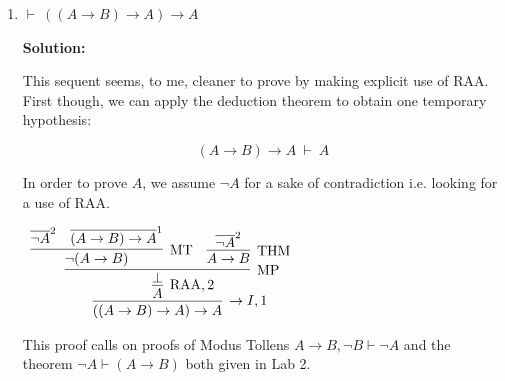 \documentclass[11pt]{report}
\newcommand{\temp}[2]{{\overline{#2}}^{#1}}
\begin{document}
\begin{enumerate}
\begin{enumerate}
		To complete the proof the two sub-goals need to be joined with a conjunction introduction. 

		Proof which makes explicit use of RAA. It also calls on a proof of $\vdash \ \lnot A \to (A \to B)$ from Lab Two. This is denoted by the label THM in the proof; here we are calling on a THeoreM that we have already proved elsewhere.

		\begin{footnotesize}
		\begin{center}
			$\begin{array}{c}
				\infer[\land I]{A \land \lnot B}
					{\infer[\RAA,1]{A}
						{\infer[\MP]{\bot}
							{\infer[\MP]{A \to B}
								{\infer[1]{\cancel{\lnot A}}{}
								&
								\infer[\THM]{\lnot A \to (A \to B)}{}}
							&
							\lnot(A \to B)}}
					&
					\infer[\to I,2]{\lnot B}
						{\infer[\MP]{\bot}
							{\infer[\to I]{A \to B}
								{\infer[2]{\cancel{B}}{}}
							&
							\lnot(A \to B)}}}
			\end{array}$
		\end{center}
		\end{footnotesize}		
		
		\newpage
		\item $\vdash \ ((A \to B) \to A) \to A$  
		
		\textbf{Solution:}

		This sequent seems, to me, cleaner to prove by making explicit use of RAA. First though, we can apply the deduction theorem to obtain one temporary hypothesis: 
		
		$$(A \to B) \to A \ \vdash \ A$$

		In order to prove $A$, we assume $\lnot A$ for a sake of contradiction i.e. looking for a use of RAA. 

		\begin{center}
			$\begin{array}{c}
				\infer[\to I, 1]{((A \to B) \to A) \to A}
					{\infer[\RAA,2]{A}
						{\infer[\MP]{\bot}
							{\infer[\MT]{\lnot(A \to B)}
								{\temp{2}{\lnot A}
								&
								\temp{1}{(A \to B) \to A}}
							&
							\infer[\THM]{A \to B}
								{\temp{2}{\lnot A}}}}}
			\end{array}$
		\end{center}

		This proof calls on proofs of Modus Tollens $A \to B, \lnot B \vdash \lnot A$ and the theorem $\lnot A \vdash (A \to B)$ both given in Lab 2.

	\end{enumerate}
	

\end{enumerate}
\end{document}
